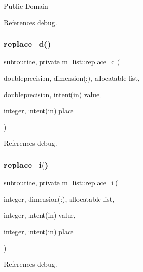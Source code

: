 Public Domain 

References debug.

\mbox{\label{namespacem__list_a9cac0a0b0d325d26267d37648f8eada6}} 
\subsubsection{\texorpdfstring{replace\+\_\+d()}{replace\_d()}}
{\footnotesize\ttfamily subroutine, private m\+\_\+list\+::replace\+\_\+d (\begin{DoxyParamCaption}\item[{doubleprecision, dimension(\+:), allocatable}]{list,  }\item[{doubleprecision, intent(in)}]{value,  }\item[{integer, intent(in)}]{place }\end{DoxyParamCaption})\hspace{0.3cm}{\ttfamily [private]}}



References debug.

\mbox{\label{namespacem__list_a8c67651ca2c2c90d921f23146577491b}} 
\subsubsection{\texorpdfstring{replace\+\_\+i()}{replace\_i()}}
{\footnotesize\ttfamily subroutine, private m\+\_\+list\+::replace\+\_\+i (\begin{DoxyParamCaption}\item[{integer, dimension(\+:), allocatable}]{list,  }\item[{integer, intent(in)}]{value,  }\item[{integer, intent(in)}]{place }\end{DoxyParamCaption})\hspace{0.3cm}{\ttfamily [private]}}



References debug.

\mbox{\label{namespacem__list_a0de977b7f38554ccd2e8b6e668f11648}} 
